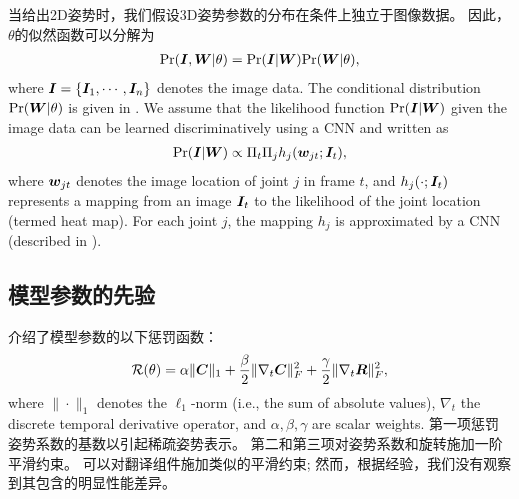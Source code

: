 当给出2D姿势时，我们假设3D姿势参数的分布在条件上独立于图像数据。 因此，$\theta$的似然函数可以分解为
\begin{align}\label{eq:likelihood-complete}
\mbox{Pr}({\bm{I}},{\bm{W}}|\theta) = \mbox{Pr}({\bm{I}}|{\bm{W}})\mbox{Pr}({\bm{W}}|\theta),
\end{align}
where ${\bm{I}}=\{{\bm{I}}_1,\cdots,{\bm{I}}_n\}$ denotes the image data. The conditional distribution $\mbox{Pr}({\bm{W}}|\theta)$ is given in . We assume that the likelihood function $\mbox{Pr}({\bm{I}}|{\bm{W}})$ given the image data can be learned discriminatively using a CNN and written as
\begin{align}\label{eq:pr-I-W}
\mbox{Pr}({\bm{I}}|{\bm{W}}) \propto \Pi_{t}\Pi_{j}h_j({\bm{w}}_{jt};{\bm{I}}_t),
\end{align}
where ${\bm{w}}_{jt}$ denotes the image location of joint $j$ in frame $t$, and $h_j(\cdot;{\bm{I}}_t)$ represents a mapping from an image ${\bm{I}}_t$ to the likelihood of the joint location (termed heat map).
For each joint $j$, the mapping $h_j$ is approximated by a CNN (described in ).

\subsection{模型参数的先验}

介绍了模型参数的以下惩罚函数：
\begin{align}\label{eq:prior}
\mathcal{R}(\theta) = \alpha\|{\bm{C}}\|_1 + \frac{\beta}{2}\|\nabla_t{\bm{C}}\|_F^2 + \frac{\gamma}{2}\|\nabla_t{\bm{R}}\|_F^2,
\end{align}
where $\|\cdot\|_1$ denotes the $\ell_1$-norm (i.e., the sum of absolute values), $\nabla_t$ the discrete temporal derivative operator, and
$\alpha, \beta, \gamma$ are scalar weights. 
第一项惩罚姿势系数的基数以引起稀疏姿势表示。 第二和第三项对姿势系数和旋转施加一阶平滑约束。
可以对翻译组件施加类似的平滑约束; 然而，根据经验，我们没有观察到其包含的明显性能差异。


